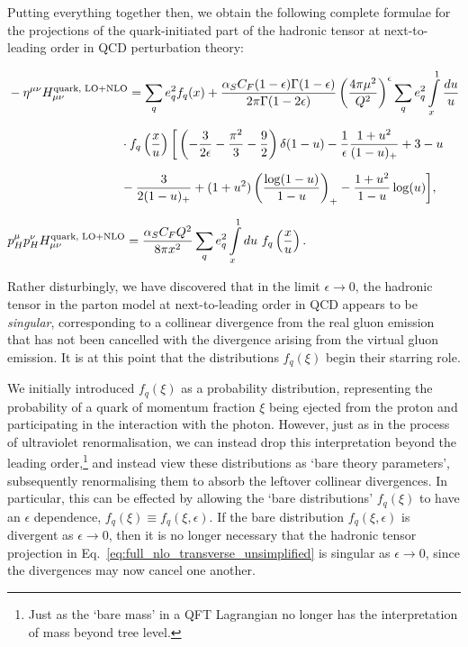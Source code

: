 \documentclass[withindex,glossary]{cam-thesis}
\begin{document}
\noindent Putting everything together then, we obtain the following complete formulae for the projections of the quark-initiated part of the hadronic tensor at next-to-leading order in QCD perturbation theory:
\begin{framed}
\begin{align}
\label{eq:full_nlo_transverse_unsimplified}
&-\eta^{\mu\nu} H_{\mu\nu}^{\text{quark, LO+NLO}} = \sum_{q} e_q^2 f_q(x) + \frac{\alpha_S C_F (1-\epsilon) \Gamma(1-\epsilon)}{2\pi \Gamma(1-2\epsilon)} \left( \frac{4\pi \mu^2}{Q^2} \right)^{\epsilon} \sum_{q} e_q^2 \int\limits_{x}^{1} \frac{du}{u} \notag \\[1.5ex]
&\qquad\qquad\qquad\qquad\quad \cdot f_q\left( \frac{x}{u} \right)\bigg[ \left( -\frac{3}{2\epsilon} - \frac{\pi^2}{3} - \frac{9}{2} \right) \delta(1-u) - \frac{1}{\epsilon} \frac{1 + u^2}{(1-u)_+} + 3 - u \notag \\[1.5ex]
&\qquad\qquad\qquad\qquad\quad - \frac{3}{2(1-u)_+} + (1+u^2) \left( \frac{\log(1-u)}{1-u} \right)_+ - \frac{1+u^2}{1-u} \log(u) \bigg], \\[1.5ex]
&p_H^{\mu} p_H^{\nu} H_{\mu\nu}^{\text{quark, LO+NLO}} = \frac{\alpha_S C_F Q^2}{8\pi x^2}  \sum_{q} e_q^2 \int\limits_{x}^{1} du\ f_q\left( \frac{x}{u} \right).
\end{align}
\end{framed}
\noindent Rather disturbingly, we have discovered that in the limit $\epsilon \rightarrow 0$, the hadronic tensor in the parton model at next-to-leading order in QCD appears to be \textit{singular}, corresponding to a collinear divergence from the real gluon emission that has not been cancelled with the divergence arising from the virtual gluon emission. It is at this point that the distributions $f_{q}(\xi)$ begin their starring role. 

We initially introduced $f_q(\xi)$ as a probability distribution, representing the probability of a quark of momentum fraction $\xi$ being ejected from the proton and participating in the interaction with the photon. However, just as in the process of ultraviolet renormalisation, we can instead drop this interpretation beyond the leading order,\footnote{Just as the `bare mass' in a QFT Lagrangian no longer has the interpretation of mass beyond tree level.} and instead view these distributions as `bare theory parameters', subsequently renormalising them to absorb the leftover collinear divergences. In particular, this can be effected by allowing the `bare distributions' $f_q(\xi)$ to have an $\epsilon$ dependence, $f_q(\xi) \equiv f_q(\xi,\epsilon)$. If the bare distribution $f_q(\xi,\epsilon)$ is divergent as $\epsilon \rightarrow 0$, then it is no longer necessary that the hadronic tensor projection in Eq.~\eqref{eq:full_nlo_transverse_unsimplified} is singular as $\epsilon \rightarrow 0$, since the divergences may now cancel one another. 
\end{document}
